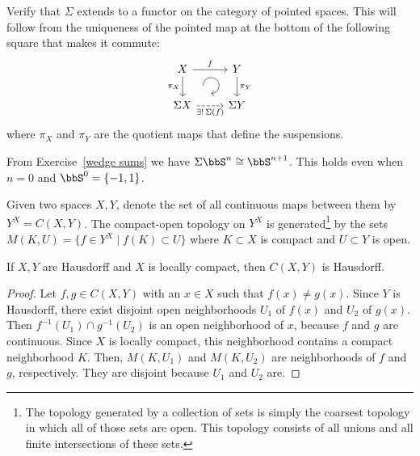 \begin{xca}
    Verify that $\Sigma$ extends to a functor on the category of pointed spaces. This will follow from the uniqueness of the pointed map at the bottom of the following square that makes it commute:
    \[\begin{tikzcd}[every matrix/.append style={name=m},   
    execute at end picture={\draw [<-] ([xshift=-2.3em,yshift=1mm]m-2-2.north) arc[start angle=-90,delta angle=270,radius=0.25cm];}]
   X \arrow[r,"f"]\arrow[d,swap,"\pi_X"]& Y\arrow[d,"\pi_Y"] \\
   \Sigma X\arrow[r,swap,dashed, "\exists !\,\Sigma(f)"]& \Sigma Y
    \end{tikzcd}\]
    where $\pi_X$ and $\pi_Y$ are the quotient maps that define the suspensions.
\end{xca}

\begin{example}
    From Exercise~\ref{wedge sums} we have $\Sigma \bbS^n\cong \bbS^{n+1}$. This holds even when $n=0$ and $\bbS^0=\{-1,1\}$.
\end{example}

\begin{defn}
    Given two spaces $X,Y$, denote the set of all continuous maps between them by $Y^X=C(X,Y)$. The compact-open topology on $Y^X$ is generated\footnote{The topology generated by a collection of sets is simply the coarsest topology in which all of those sets are open. This topology consists of all unions and all finite intersections of these sets.} by the sets $M(K,U)=\{f\in Y^X\mid f(K)\subset U\}$ where $K\subset X$ is compact and $U\subset Y$ is open.
\end{defn}

\begin{prop}
    If $X,Y$ are Hausdorff and $X$ is locally compact, then $C(X,Y)$ is Hausdorff.
\end{prop}
\begin{proof}
    Let $f,g\in C(X,Y)$ with an $x\in X$ such that $f(x)\neq g(x)$. Since $Y$ is Hausdorff, there exist disjoint open neighborhoods $U_1$ of $f(x)$ and $U_2$ of $g(x)$. Then $f^{-1}(U_1)\cap g^{-1}(U_2)$ is an open neighborhood of $x$, because $f$ and $g$ are continuous. Since $X$ is locally compact, this neighborhood contains a compact neighborhood $K$. Then, $M(K,U_1)$ and $M(K,U_2)$ are neighborhoods of $f$ and $g$, respectively. They are disjoint because $U_1$ and $U_2$ are.
\end{proof}

